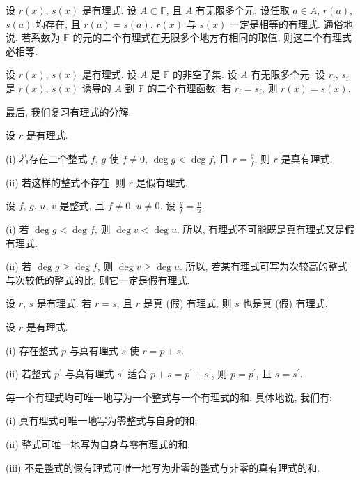 \begin{proposition}
    设 $r(x)$, $s(x)$ 是有理式. 设 $A \subset \mathbb{F}$, 且 $A$ 有无限多个元. 设任取 $a \in A$, $r(a)$, $s(a)$ 均存在, 且 $r(a) = s(a)$. $r(x)$ 与 $s(x)$ 一定是相等的有理式. 通俗地说, 若系数为 $\mathbb{F}$ 的元的二个有理式在无限多个地方有相同的取值, 则这二个有理式必相等.
\end{proposition}

\begin{proposition}
    设 $r(x)$, $s(x)$ 是有理式. 设 $A$ 是 $\mathbb{F}$ 的非空子集. 设 $A$ 有无限多个元. 设 $r_{\mathrm{f}}$, $s_{\mathrm{f}}$ 是 $r(x)$, $s(x)$ 诱导的 $A$ 到 $\mathbb{F}$ 的二个有理函数. 若 $r_{\mathrm{f}} = s_{\mathrm{f}}$, 则 $r(x) = s(x)$.
\end{proposition}

最后, 我们复习有理式的分解.

\begin{definition}
    设 $r$ 是有理式.

    (i) 若存在二个整式 $f$, $g$ 使 $f \neq 0$, $\deg g < \deg f$, 且 $r = \frac{g}{f}$, 则 $r$ 是真有理式.

    (ii) 若这样的整式不存在, 则 $r$ 是假有理式.
\end{definition}

\begin{proposition}
    设 $f$, $g$, $u$, $v$ 是整式, 且 $f \neq 0$, $u \neq 0$. 设 $\frac{g}{f} = \frac{v}{u}$.

    (i) 若 $\deg g < \deg f$, 则 $\deg v < \deg u$. 所以, 有理式不可能既是真有理式又是假有理式.

    (ii) 若 $\deg g \geq \deg f$, 则 $\deg v \geq \deg u$. 所以, 若某有理式可写为次较高的整式与次较低的整式的比, 则它一定是假有理式.
\end{proposition}

\begin{proposition}
    设 $r$, $s$ 是有理式. 若 $r = s$, 且 $r$ 是真 (假) 有理式, 则 $s$ 也是真 (假) 有理式.
\end{proposition}

\begin{proposition}
    设 $r$ 是有理式.

    (i) 存在整式 $p$ 与真有理式 $s$ 使 $r = p + s$.

    (ii) 若整式 $p^{\prime}$ 与真有理式 $s^{\prime}$ 适合 $p + s = p^{\prime} + s^{\prime}$, 则 $p = p^{\prime}$, 且 $s = s^{\prime}$.
\end{proposition}

\begin{proposition}
    每一个有理式均可唯一地写为一个整式与一个有理式的和. 具体地说, 我们有:

    (i) 真有理式可唯一地写为零整式与自身的和;

    (ii) 整式可唯一地写为自身与零有理式的和;

    (iii) 不是整式的假有理式可唯一地写为非零的整式与非零的真有理式的和.
\end{proposition}

